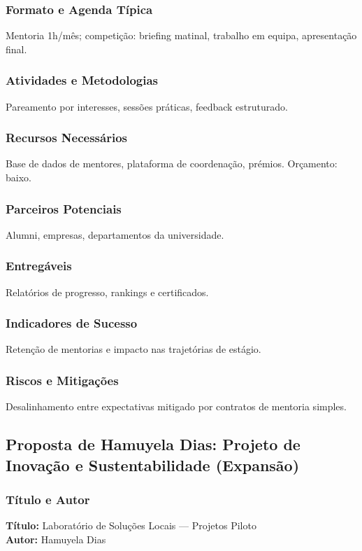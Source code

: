 \documentclass[12pt,a4paper]{article}
\begin{document}
\subsubsection*{Formato e Agenda Típica}
Mentoria 1h/mês; competição: briefing matinal, trabalho em equipa, apresentação final.

\subsubsection*{Atividades e Metodologias}
Pareamento por interesses, sessões práticas, feedback estruturado.

\subsubsection*{Recursos Necessários}
Base de dados de mentores, plataforma de coordenação, prémios. Orçamento: baixo.

\subsubsection*{Parceiros Potenciais}
Alumni, empresas, departamentos da universidade.

\subsubsection*{Entregáveis}
Relatórios de progresso, rankings e certificados.

\subsubsection*{Indicadores de Sucesso}
Retenção de mentorias e impacto nas trajetórias de estágio.

\subsubsection*{Riscos e Mitigações}
Desalinhamento entre expectativas mitigado por contratos de mentoria simples.

\subsection{Proposta de Hamuyela Dias: Projeto de Inovação e Sustentabilidade (Expansão)}

\subsubsection*{Título e Autor}
\textbf{Título:} Laboratório de Soluções Locais — Projetos Piloto \\
\textbf{Autor:} Hamuyela Dias
\end{document}

